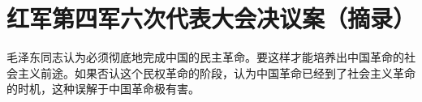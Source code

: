 \section[红军第四军六次代表大会决议案（摘录）（一九二八年十二月）]{红军第四军六次代表大会决议案（摘录）}


毛泽东同志认为必须彻底地完成中国的民主革命。要这样才能培养出中国革命的社会主义前途。如果否认这个民权革命的阶段，认为中国革命已经到了社会主义革命的时机，这种误解于中国革命极有害。

